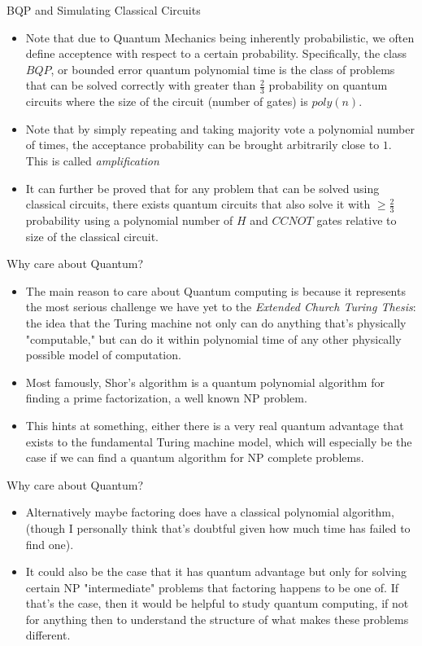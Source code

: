 \documentclass[aspectratio=169]{beamer}
\begin{document}
\begin{frame}{BQP and Simulating Classical Circuits}
  \begin{itemize}
    \item Note that due to Quantum Mechanics being inherently probabilistic, we often define acceptence with respect to a certain probability. Specifically, the class $BQP$, or bounded error quantum polynomial time is the class of problems that can be solved correctly with greater than $\frac{2}{3}$ probability on quantum circuits where the size of the circuit (number of gates) is $poly(n)$. \pause
    \item Note that by simply repeating and taking majority vote a polynomial number of times, the acceptance probability can be brought arbitrarily close to $1$. This is called \emph{amplification} \pause
    \item It can further be proved that for any problem that can be solved using classical circuits, there exists quantum circuits that also solve it with $\geq \frac{2}{3}$ probability using a polynomial number of $H$ and $CCNOT$ gates relative to size of the classical circuit.
  \end{itemize}
\end{frame}

\begin{frame}{Why care about Quantum?}
  \begin{itemize}
    \item The main reason to care about Quantum computing is because it represents the most serious challenge we have yet to the \emph{Extended Church Turing Thesis}: the idea that the Turing machine not only can do anything that's physically "computable," but can do it within polynomial time of any other physically possible model of computation. \pause
    \item Most famously, Shor's algorithm is a quantum polynomial algorithm for finding a prime factorization, a well known NP problem. \pause
    \item This hints at something, either there is a very real quantum advantage that exists to the fundamental Turing machine model, which will especially be the case if we can find a quantum algorithm for NP complete problems.
  \end{itemize}
\end{frame}

\begin{frame}{Why care about Quantum?}
  \begin{itemize}
    \item Alternatively maybe factoring does have a classical polynomial algorithm, (though I personally think that's doubtful given how much time has failed to find one). \pause
    \item It could also be the case that it has quantum advantage but only for solving certain NP "intermediate" problems that factoring happens to be one of. If that's the case, then it would be helpful to study quantum computing, if not for anything then to understand the structure of what makes these problems different.
  \end{itemize}
\end{frame}
\end{document}
